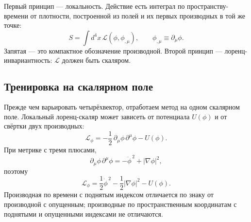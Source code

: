 Первый принцип — локальность. Действие есть интеграл по пространству-времени
от плотности, построенной из полей и их первых производных в той же
точке:
\begin{equation}
S=\int d^4x\,\mathcal L(\phi,\phi_{,\mu}),
\qquad
\phi_{,\mu}\equiv\partial_\mu\phi.
\label{eq:local-action}
\end{equation}
Запятая — это компактное обозначение производной. Второй принцип —
лоренц-инвариантность: \(\mathcal L\) должен быть скаляром.

\subsection{Тренировка на скалярном поле}

Прежде чем варьировать четырёхвектор, отработаем метод на одном скалярном поле.
Локальный лоренц-скаляр может зависеть от потенциала \(U(\phi)\) и от
свёртки двух производных:
\begin{equation}
\mathcal L_\phi
=
-\frac12\,\partial_\mu\phi\,\partial^\mu\phi-U(\phi).
\label{eq:scalar-lagrangian}
\end{equation}
При метрике с тремя плюсами,
\begin{equation}
\partial_\mu\phi\,\partial^\mu\phi
=
-\dot\phi^{\,2}+|\nabla\phi|^2,
\end{equation}
поэтому
\begin{equation}
\mathcal L_\phi
=
\frac12\dot\phi^{\,2}
-\frac12|\nabla\phi|^2
-U(\phi).
\end{equation}
Производная по времени с поднятым индексом отличается по знаку от производной с опущенным; производные по пространственным координатам с поднятыми
и опущенными индексами не отличаются.

\begin{classroomqa}
\end{classroomqa}

